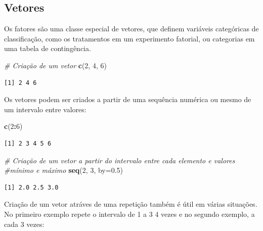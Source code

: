 \documentclass[12pt,portuguese,oneside]{book}
\newenvironment{Shaded}{\begin{snugshade}}{\end{snugshade}}
\newcommand{\KeywordTok}[1]{\textcolor[rgb]{0.13,0.29,0.53}{\textbf{#1}}}
\newcommand{\DataTypeTok}[1]{\textcolor[rgb]{0.13,0.29,0.53}{#1}}
\newcommand{\DecValTok}[1]{\textcolor[rgb]{0.00,0.00,0.81}{#1}}
\newcommand{\FloatTok}[1]{\textcolor[rgb]{0.00,0.00,0.81}{#1}}
\newcommand{\CommentTok}[1]{\textcolor[rgb]{0.56,0.35,0.01}{\textit{#1}}}
\newcommand{\OperatorTok}[1]{\textcolor[rgb]{0.81,0.36,0.00}{\textbf{#1}}}
\newcommand{\NormalTok}[1]{#1}
\begin{document}
\subsection{Vetores}\label{vetores}

Os fatores são uma classe especial de vetores, que definem variáveis
categóricas de classificação, como os tratamentos em um experimento
fatorial, ou categorias em uma tabela de contingência.

\begin{Shaded}
\begin{Highlighting}[]
\CommentTok{# Criação de um vetor}
\KeywordTok{c}\NormalTok{(}\DecValTok{2}\NormalTok{, }\DecValTok{4}\NormalTok{, }\DecValTok{6}\NormalTok{)}
\end{Highlighting}
\end{Shaded}

\begin{verbatim}
[1] 2 4 6
\end{verbatim}

Os vetores podem ser criados a partir de uma sequência numérica ou mesmo
de um intervalo entre valores:

\begin{Shaded}
\begin{Highlighting}[]
\KeywordTok{c}\NormalTok{(}\DecValTok{2}\OperatorTok{:}\DecValTok{6}\NormalTok{)}
\end{Highlighting}
\end{Shaded}

\begin{verbatim}
[1] 2 3 4 5 6
\end{verbatim}

\begin{Shaded}
\begin{Highlighting}[]
\CommentTok{# Criação de um vetor a partir do intervalo entre cada elemento e valores}
\CommentTok{#mínimo e máximo}
\KeywordTok{seq}\NormalTok{(}\DecValTok{2}\NormalTok{, }\DecValTok{3}\NormalTok{, }\DataTypeTok{by=}\FloatTok{0.5}\NormalTok{)}
\end{Highlighting}
\end{Shaded}

\begin{verbatim}
[1] 2.0 2.5 3.0
\end{verbatim}

Criação de um vetor atráves de uma repetição também é útil em várias
situações. No primeiro exemplo repete o intervalo de 1 a 3 4 vezes e no
segundo exemplo, a cada 3 vezes:
\end{document}
